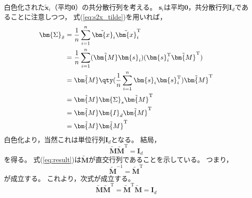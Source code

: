\documentclass[class=jsarticle, crop=false, dvipdfmx, fleqn]{standalone}
\begin{document}
白色化された\(\tilde{\bm{x}}_i\)（平均\(\bm{0}\)）の共分散行列を考える。
\(\bm{s}_i\)は平均\(\bm{0}\)，共分散行列\(\bm{I}_d\)であることに注意しつつ，
式(\ref{eq:s2x_tilde})を用いれば，
\begin{align}
    \bm{\Sigma}_{\tilde{x}}
        & = \frac{1}{n} \sum_{i=1}^{n} \tilde{\bm{x}}_i \tilde{\bm{x}}_i^\mathrm{T} \\
        & = \frac{1}{n} \sum_{i=1}^{n} (\tilde{\bm{M}} \bm{s}_i) (\bm{s}_i^\mathrm{T} \tilde{\bm{M}}^\mathrm{T}) \\
        & = \tilde{\bm{M}} \qty(\frac{1}{n} \sum_{i=1}^{n} \bm{s}_i \bm{s}_i^\mathrm{T}) \tilde{\bm{M}}^\mathrm{T} \\
        & = \tilde{\bm{M}} \bm{\Sigma}_s \tilde{\bm{M}}^\mathrm{T} \\
        & = \tilde{\bm{M}} \bm{I}_d \tilde{\bm{M}}^\mathrm{T} \\
        & = \tilde{\bm{M}} \tilde{\bm{M}}^\mathrm{T}
\end{align}
白色化より，当然これは単位行列\(\bm{I}_d\)となる。
結局，
\begin{equation}
    \tilde{\bm{M}} \tilde{\bm{M}}^\mathrm{T} = \bm{I}_d
    \label{eq:result}
\end{equation}
を得る。
式(\ref{eq:result})は\(\tilde{\bm{M}}\)が直交行列であることを示している。
つまり，
\begin{equation}
    \tilde{\bm{M}}^{-1} = \tilde{\bm{M}}^\mathrm{T}
\end{equation}
が成立する。
これより，次式が成立する。
\begin{equation}
    \tilde{\bm{M}} \tilde{\bm{M}}^\mathrm{T} = \tilde{\bm{M}}^\mathrm{T} \tilde{\bm{M}} = \bm{I}_d
\end{equation}
\end{document}

